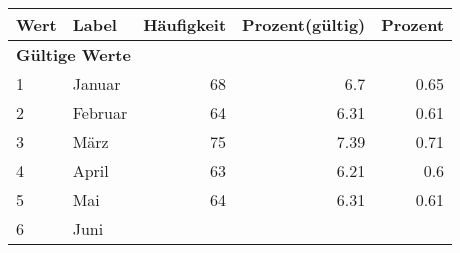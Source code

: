      \begin{longtable}{lXrrr}
     \toprule
     \textbf{Wert} & \textbf{Label} & \textbf{Häufigkeit} & \textbf{Prozent(gültig)} & \textbf{Prozent} \\
     \endhead
     \midrule
     \multicolumn{5}{l}{\textbf{Gültige Werte}}\\

     1 &
     \multicolumn{1}{X}{ Januar   } &


       \num{68} &
       \num[round-mode=places,round-precision=2]{6,7} &
         \num[round-mode=places,round-precision=2]{0,65} \\

     2 &
     \multicolumn{1}{X}{ Februar   } &


       \num{64} &
       \num[round-mode=places,round-precision=2]{6,31} &
         \num[round-mode=places,round-precision=2]{0,61} \\

     3 &
     \multicolumn{1}{X}{ März   } &


       \num{75} &
       \num[round-mode=places,round-precision=2]{7,39} &
         \num[round-mode=places,round-precision=2]{0,71} \\

     4 &
     \multicolumn{1}{X}{ April   } &


       \num{63} &
       \num[round-mode=places,round-precision=2]{6,21} &
         \num[round-mode=places,round-precision=2]{0,6} \\

     5 &
     \multicolumn{1}{X}{ Mai   } &


       \num{64} &
       \num[round-mode=places,round-precision=2]{6,31} &
         \num[round-mode=places,round-precision=2]{0,61} \\

     6 &
     \multicolumn{1}{X}{ Juni   } &



\end{longtable}
